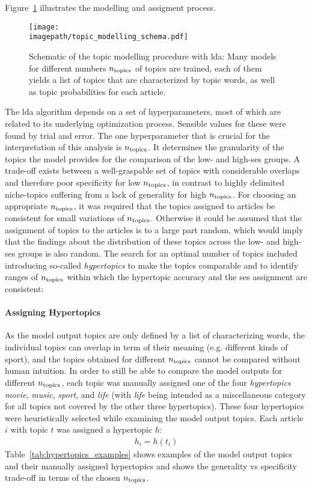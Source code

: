 Figure~\ref{fig:topic_modelling_schema} illustrates the modelling and assigment process.
\begin{figure}
    \centering
    \texttt{[image: \\imagepath/topic\_modelling\_schema.pdf]}
    \caption{Schematic of the topic modelling procedure with \gls{lda}: Many models for different numbers $n_\text{topics}$ of topics are trained, each of them yields a list of topics that are characterized by topic words, as well as topic probabilities for each article.}\label{fig:topic_modelling_schema}
\end{figure}

The \gls{lda} algorithm depends on a set of hyperparameters, most of which are related to its underlying optimization process.  Sensible values for these were found by trial and error. The one hyperparameter that is crucial for the interpretation of this analysis is $n_\text{topics}$. It determines the granularity of the topics the model provides for the comparison of the low- and high-\gls{ses} groups. A trade-off exists between a well-graspable set of topics with considerable overlaps and therefore poor specificity for low $n_\text{topics}$, in contrast to highly delimited niche-topics suffering from a lack of generality for high $n_\text{topics}$. For choosing an appropriate $n_\text{topics}$, it was required that the topics assigned to articles be consistent for small variations of $n_\text{topics}$. Otherwise it could be assumed that the assignment of topics to the articles is to a large part random, which would imply that the findings about the distribution of these topics across the low- and high-\gls{ses} groups is also random. The search for an optimal number of topics included introducing so-called \textit{hypertopics} to make the topics comparable and to identify ranges of $n_\text{topics}$ within which the hypertopic accuracy and the \gls{ses} assignment are consistent:

\paragraph{Assigning Hypertopics}
As the model output topics are only defined by a list of characterizing words, the individual topics can overlap in term of their meaning (e.g. different kinds of sport), and the topics obtained for different $n_\text{topics}$ cannot be compared without human intuition. In order to still be able to compare the model outputs for different $n_\text{topics}$, each topic was manually assigned one of the four \textit{hypertopics} \textit{movie}, \textit{music}, \textit{sport}, and \textit{life} (with \textit{life} being intended as a miscellaneous category for all topics not covered by the other three hypertopics). These four hypertopics were heuristically selected while examining the model output topics. Each article $i$ with topic $t$ was assigned a hypertopic $h$:
\begin{align}
    h_i = h(t_i)
\end{align}
Table~\ref{tab:hypertopics_examples} shows examples of the model output topics and their manually assigned hypertopics and shows the generality vs specificity trade-off in terms of the chosen $n_\text{topics}$.

